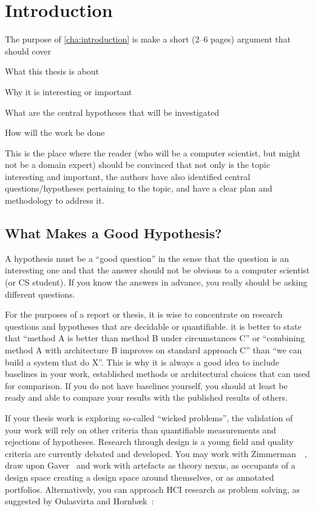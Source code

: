 \chapter{Introduction}
\label{cha:introduction}

The purpose of \autoref{cha:introduction} is make a short (2--6 pages)
argument that should cover
\begin{aenumerate}
\item What this thesis is about
\item Why it is interesting or important
\item What are the central hypotheses that will be investigated 
\item How will the work be done
\end{aenumerate}

This is the place where the reader (who will be a computer scientist, but
might not be a domain expert) should be convinced that not only is the topic
interesting and important, the authors have also identified central
questions/hypotheses pertaining to the topic, and have a clear plan and
methodology to address it.

\section{What Makes a Good Hypothesis?}
\label{sec:what-makes-good}

A hypothesis must be a ``good question'' in the sense that the question is
an interesting one and that the answer should not be obvious to a computer
scientist (or CS student).  If you know the answers in advance, you really
should be asking different questions.

For the purposes of a report or thesis, it is wise to concentrate on
research questions and hypotheses that are decidable or quantifiable. \Eg it
is better to state that ``method A is better than method B under
circumstances C'' or ``combining method A with architecture B improves on
standard approach C'' than ``we can build a system that do X''.  This is why
it is always a good idea to include baselines in your work, \ie established
methods or architectural choices that can used for comparison. If you do not
have baselines yourself, you should at least be ready and able to compare
your results with the published results of others.

If your thesis work is exploring so-called ``wicked problems'', the validation
of your work will rely on other criteria than quantifiable measurements and
rejections of hypotheses.  Research through design is a young field and
quality criteria are currently debated and developed. You may work with
Zimmerman~\etal~\cite{Zimmerman2007:POTSCOHFICS2007}, draw upon
Gaver~\cite{Gaver2012:POTSCOHFICS2012} and work with artefacts as theory
nexus, as occupants of a design space creating a design space around
themselves, or as annotated portfolios. Alternatively, you can approach HCI
research as problem solving, as suggested by Oulasvirta and
Hornbæk~\cite{Oulasvirta2016:POT2CCOHFICS2016}:

